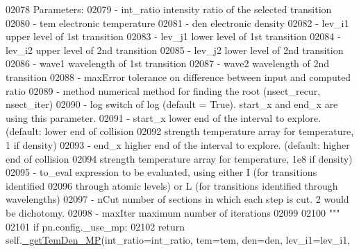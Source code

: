 \begin{DoxyCode}
02078 \textcolor{stringliteral}{        Parameters:}
02079 \textcolor{stringliteral}{            - int\_ratio    intensity ratio of the selected transition}
02080 \textcolor{stringliteral}{            - tem          electronic temperature}
02081 \textcolor{stringliteral}{            - den          electronic density}
02082 \textcolor{stringliteral}{            - lev\_i1       upper level of 1st transition}
02083 \textcolor{stringliteral}{            - lev\_j1       lower level of 1st transition}
02084 \textcolor{stringliteral}{            - lev\_i2       upper level of 2nd transition}
02085 \textcolor{stringliteral}{            - lev\_j2       lower level of 2nd transition}
02086 \textcolor{stringliteral}{            - wave1        wavelength of 1st transition}
02087 \textcolor{stringliteral}{            - wave2        wavelength of 2nd transition}
02088 \textcolor{stringliteral}{            - maxError     tolerance on difference between input and computed ratio }
02089 \textcolor{stringliteral}{            - method       numerical method for finding the root (nsect\_recur, nsect\_iter)}
02090 \textcolor{stringliteral}{            - log          switch of log (default = True). start\_x and end\_x are using this parameter.}
02091 \textcolor{stringliteral}{            - start\_x      lower end of the interval to explore. (default: lower end of collision }
02092 \textcolor{stringliteral}{                            strength temperature array for temperature, 1 if density)}
02093 \textcolor{stringliteral}{            - end\_x        higher end of the interval to explore. (default: higher end of collision }
02094 \textcolor{stringliteral}{                            strength temperature array for temperature, 1e8 if density)}
02095 \textcolor{stringliteral}{            - to\_eval      expression to be evaluated, using either I (for transitions identified }
02096 \textcolor{stringliteral}{                            through atomic levels) or L (for transitions identified through wavelengths)}
02097 \textcolor{stringliteral}{            - nCut        number of sections in which each step is cut. 2 would be dichotomy.}
02098 \textcolor{stringliteral}{            - maxIter     maximum number of iterations}
02099 \textcolor{stringliteral}{}
02100 \textcolor{stringliteral}{        """}        
02101         \textcolor{keywordflow}{if} pn.config.\_use\_mp:
02102             \textcolor{keywordflow}{return} self.\hyperlink{classpyneb_1_1core_1_1pynebcore_1_1_atom_a3a7c4f43d58a5988d04cbe23ed9593ba}{\_getTemDen\_MP}(int\_ratio=int\_ratio, tem=tem, den=den, lev\_i1=lev\_i1, 

\end{DoxyCode}
